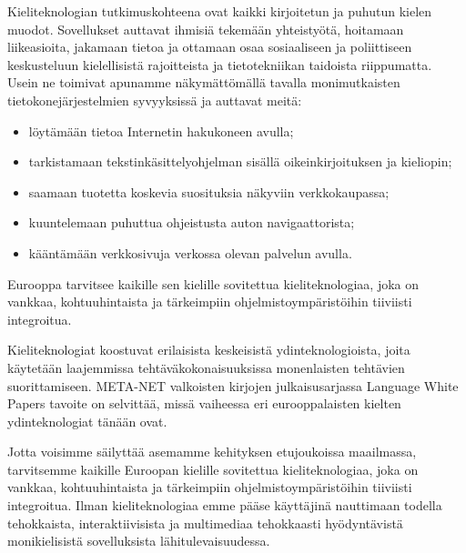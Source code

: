 \documentclass[]{../../metanetpaper}
\begin{document}
\begin{Parallel}[c]{70mm}{70mm}
{Kieliteknologian tutkimuskohteena ovat kaikki kirjoitetun ja puhutun kielen
muodot. Sovellukset auttavat ihmisiä tekemään yhteistyötä, hoitamaan
liikeasioita, jakamaan tietoa ja ottamaan osaa sosiaaliseen ja poliittiseen
keskusteluun kielellisistä rajoitteista ja tietotekniikan taidoista
riippumatta. Usein ne toimivat apunamme näkymättömällä tavalla monimutkaisten
tietokonejärjestelmien syvyyksissä ja auttavat meitä:
\begin{itemize}
\item löytämään tietoa Internetin hakukoneen avulla;

\item tarkistamaan tekstinkäsittelyohjelman sisällä oikeinkirjoituksen ja kieliopin;

\item saamaan tuotetta koskevia suosituksia näkyviin verkkokaupassa;

\item kuuntelemaan puhuttua ohjeistusta auton navigaattorista;

\item kääntämään verkkosivuja verkossa olevan palvelun avulla.
\end{itemize}
Eurooppa tarvitsee kaikille sen kielille sovitettua kieliteknologiaa, joka on
vankkaa, kohtuuhintaista ja tärkeimpiin ohjelmistoympäristöihin tiiviisti
integroitua.





Kieliteknologiat koostuvat erilaisista keskeisistä ydinteknologioista, joita
käytetään laajemmissa tehtäväkokonaisuuksissa monenlaisten tehtävien
suorittamiseen. META-NET valkoisten kirjojen julkaisusarjassa Language White
Papers tavoite on selvittää, missä vaiheessa eri eurooppalaisten kielten
ydinteknologiat tänään ovat.

Jotta voisimme säilyttää asemamme kehityksen etujoukoissa maailmassa,
tarvitsemme kaikille Euroopan kielille sovitettua kieliteknologiaa, joka on
vankkaa, kohtuuhintaista ja tärkeimpiin ohjelmistoympäristöihin tiiviisti
integroitua. Ilman kieliteknologiaa emme pääse käyttäjinä nauttimaan todella
tehokkaista, interaktiivisista ja multimediaa tehokkaasti hyödyntävistä
monikielisistä sovelluksista lähitulevaisuudessa.
}

\end{Parallel}
\end{document}
